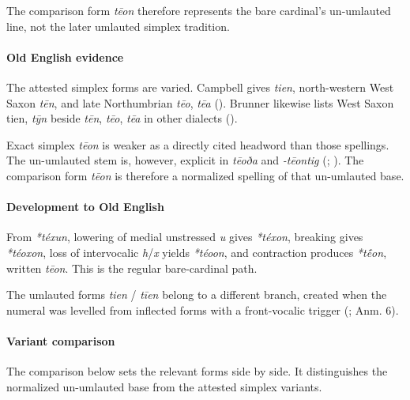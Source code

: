 \documentclass[
  british,
  a4paper,
]{article}
\begin{document}
The comparison form \emph{tēon} therefore represents the bare cardinal's
un-umlauted line, not the later umlauted simplex tradition.

\paragraph{Old English evidence}\label{old-english-evidence-1}

The attested simplex forms are varied. Campbell gives \emph{tien},
north-western West Saxon \emph{tēn}, and late Northumbrian \emph{tēo},
\emph{tēa} ().
Brunner likewise lists West Saxon tien, \emph{tȳn} beside \emph{tēn},
\emph{tēo}, \emph{tēa} in other dialects
().

Exact simplex \emph{tēon} is weaker as a directly cited headword than
those spellings. The un-umlauted stem is, however, explicit in
\emph{tēoða} and \emph{-tēontig}
(;
). The comparison form
\emph{tēon} is therefore a normalized spelling of that un-umlauted base.

\paragraph{Development to Old
English}\label{development-to-old-english-1}

From \emph{*téxun}, lowering of medial unstressed \emph{u} gives
\emph{*téxon}, breaking gives \emph{*téoxon}, loss of intervocalic
\emph{h}/\emph{x} yields \emph{*téoon}, and contraction produces
\emph{*tḗon}, written \emph{tēon}. This is the regular bare-cardinal
path.

The umlauted forms \emph{tien} / \emph{tīen} belong to a different
branch, created when the numeral was levelled from inflected forms with
a front-vocalic trigger (;
 Anm. 6).

\paragraph{Variant comparison}\label{variant-comparison-1}

The comparison below sets the relevant forms side by side. It
distinguishes the normalized un-umlauted base from the attested simplex
variants.
\end{document}
